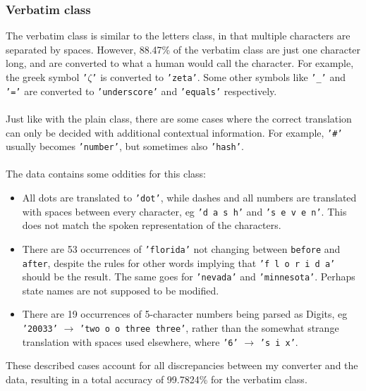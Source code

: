 \documentclass[a4paper, 9pt]{extarticle}
\newcommand{\code}{\texttt}
\newcommand{\str}[1]{\texttt{'#1'}}
\begin{document}
\subsubsection{Verbatim class}
The verbatim class is similar to the letters class, in that multiple characters are separated by spaces. However, 88.47\% of the verbatim class are just one character long, and are converted to what a human would call the character. For example, the greek symbol \str{$\zeta$} is converted to \str{zeta}. Some other symbols like \str{\_} and \str{=} are converted to \str{underscore} and \str{equals} respectively.\\
\\
Just like with the plain class, there are some cases where the correct translation can only be decided with additional contextual information. For example, \str{\#} usually becomes \str{number}, but sometimes also \str{hash}.\\
\\
The data contains some oddities for this class:
\begin{itemize}
    \itemsep-0.3em
    \item All dots are translated to \str{dot}, while dashes and all numbers are translated with spaces between every character, eg \str{d a s h} and \str{s e v e n}. This does not match the spoken representation of the characters.
    \item There are 53 occurrences of \str{florida} not changing between \code{before} and \code{after}, despite the rules for other words implying that \str{f l o r i d a} should be the result. The same goes for \str{nevada} and \str{minnesota}. Perhaps state names are not supposed to be modified.
    \item There are 19 occurrences of 5-character numbers being parsed as Digits, eg \str{20033} $\to$ \str{two o o three three}, rather than the somewhat strange translation with spaces used elsewhere, where \str{6} $\to$ \str{s i x}.
\end{itemize}
These described cases account for all discrepancies between my converter and the data, resulting in a total accuracy of 99.7824\% for the verbatim class.
\end{document}
